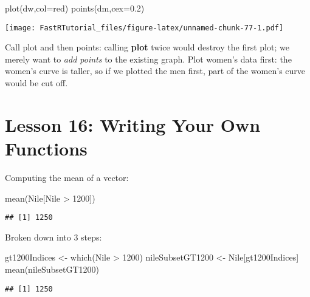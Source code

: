 \documentclass[
]{article}
\newenvironment{Shaded}{\begin{snugshade}}{\end{snugshade}}
\newcommand{\AttributeTok}[1]{\textcolor[rgb]{0.77,0.63,0.00}{#1}}
\newcommand{\DecValTok}[1]{\textcolor[rgb]{0.00,0.00,0.81}{#1}}
\newcommand{\FloatTok}[1]{\textcolor[rgb]{0.00,0.00,0.81}{#1}}
\newcommand{\FunctionTok}[1]{\textcolor[rgb]{0.00,0.00,0.00}{#1}}
\newcommand{\NormalTok}[1]{#1}
\newcommand{\OtherTok}[1]{\textcolor[rgb]{0.56,0.35,0.01}{#1}}
\newcommand{\SpecialCharTok}[1]{\textcolor[rgb]{0.00,0.00,0.00}{#1}}
\newcommand{\StringTok}[1]{\textcolor[rgb]{0.31,0.60,0.02}{#1}}
\begin{document}
\begin{Shaded}
\begin{Highlighting}[]
\FunctionTok{plot}\NormalTok{(dw,}\AttributeTok{col=}\StringTok{\textquotesingle{}red\textquotesingle{}}\NormalTok{)}
\FunctionTok{points}\NormalTok{(dm,}\AttributeTok{cex=}\FloatTok{0.2}\NormalTok{)}
\end{Highlighting}
\end{Shaded}

\texttt{[image: FastRTutorial\_files/figure-latex/unnamed-chunk-77-1.pdf]}

Call plot and then points: calling \textbf{plot} twice would destroy the
first plot; we merely want to \emph{add points} to the existing graph.
Plot women's data first: the women's curve is taller, so if we plotted
the men first, part of the women's curve would be cut off.

\hypertarget{lesson-16-writing-your-own-functions}{%
\section{Lesson 16: Writing Your Own
Functions}\label{lesson-16-writing-your-own-functions}}

Computing the mean of a vector:

\begin{Shaded}
\begin{Highlighting}[]
\FunctionTok{mean}\NormalTok{(Nile[Nile }\SpecialCharTok{\textgreater{}} \DecValTok{1200}\NormalTok{])}
\end{Highlighting}
\end{Shaded}

\begin{verbatim}
## [1] 1250
\end{verbatim}

Broken down into 3 steps:

\begin{Shaded}
\begin{Highlighting}[]
\NormalTok{gt1200Indices }\OtherTok{\textless{}{-}} \FunctionTok{which}\NormalTok{(Nile }\SpecialCharTok{\textgreater{}} \DecValTok{1200}\NormalTok{)}
\NormalTok{nileSubsetGT1200 }\OtherTok{\textless{}{-}}\NormalTok{ Nile[gt1200Indices]}
\FunctionTok{mean}\NormalTok{(nileSubsetGT1200)}
\end{Highlighting}
\end{Shaded}

\begin{verbatim}
## [1] 1250
\end{verbatim}
\end{document}
